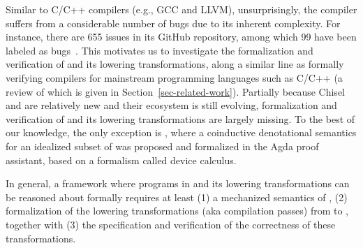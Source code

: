 Similar to C/C++ compilers (e.g., GCC and LLVM), unsurprisingly,
the {\firrtl} compiler suffers from a considerable number of bugs due to its inherent complexity. For instance, there are 655 issues in its GitHub repository, among which
99 have been labeled as bugs~\cite{FIRRTLissues}.
This motivates us to investigate the formalization and verification of {\firrtl} and its lowering transformations,
along a similar line as formally verifying compilers for mainstream programming languages such as C/C++
(a review of which is given in Section~\ref{sec-related-work}).
%
%
Partially because Chisel and {\firrtl} are relatively new and their ecosystem is still evolving, formalization and verification of {\firrtl} and its lowering transformations are largely missing.
To the best of our knowledge, the only exception is \cite{HarrisonHA21}, where a coinductive denotational semantics for an idealized subset of {\lofirrtl} was proposed and formalized in the Agda proof assistant, based on a formalism called device calculus. %

In general, a framework where programs in {\hifirrtl} and its lowering transformations can be  reasoned about formally
requires at least (1) a mechanized semantics of {\hifirrtl},
(2) formalization of %
the lowering transformations (aka compilation passes) from {\hifirrtl} to {\lofirrtl}, together with (3) the %
specification and verification of the correctness of these %
transformations. %

